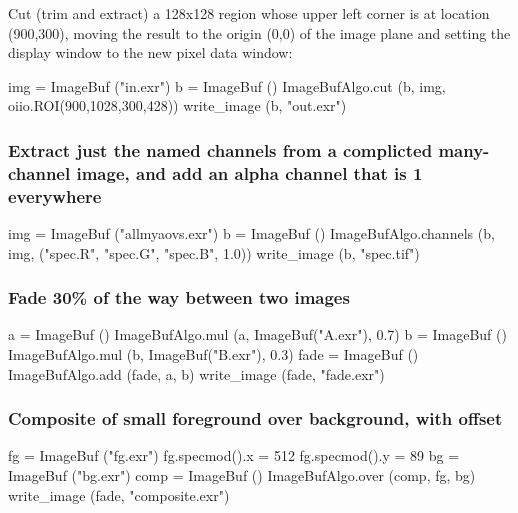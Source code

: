 \noindent Cut (trim and extract) a 128x128 region whose upper left corner
is at location (900,300), moving the result to the origin (0,0) of the image
plane and setting the display window to the new pixel data window:
\begin{code}
    img = ImageBuf ("in.exr")
    b = ImageBuf ()
    ImageBufAlgo.cut (b, img, oiio.ROI(900,1028,300,428))
    write_image (b, "out.exr")
\end{code}


\subsubsection*{Extract just the named channels from a complicted many-channel
image, and add an alpha channel that is 1 everywhere}
\begin{code}
    img = ImageBuf ("allmyaovs.exr")
    b = ImageBuf ()
    ImageBufAlgo.channels (b, img, ("spec.R", "spec.G", "spec.B", 1.0))
    write_image (b, "spec.tif")
\end{code}


\subsubsection*{Fade 30\% of the way between two images}

\begin{code}
    a = ImageBuf ()
    ImageBufAlgo.mul (a, ImageBuf("A.exr"), 0.7)
    b = ImageBuf ()
    ImageBufAlgo.mul (b, ImageBuf("B.exr"), 0.3)
    fade = ImageBuf ()
    ImageBufAlgo.add (fade, a, b)
    write_image (fade, "fade.exr")
\end{code}


\subsubsection*{Composite of small foreground over background, with offset}

\begin{code}
    fg = ImageBuf ("fg.exr")
    fg.specmod().x = 512
    fg.specmod().y = 89
    bg = ImageBuf ("bg.exr")
    comp = ImageBuf ()
    ImageBufAlgo.over (comp, fg, bg)
    write_image (fade, "composite.exr")
\end{code}





\chapwidthend
